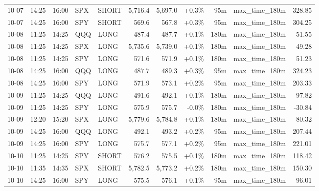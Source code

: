 \documentclass[11pt,a4paper,twoside]{article}
\begin{document}
\begin{center}
\begin{longtable}{>{\color{txtmain}}l l l l l r r r r >{\color{txtmain}}l r}
10-07 & 14:25 & 16:00 & SPX & SHORT & 5,716.4 & 5,697.0 & \textcolor{wingreen}{+0.3\%} & 95m & max\_time\_180m & \textcolor{wingreen}{328.85} \\
10-07 & 14:25 & 16:00 & SPY & SHORT & 569.6 & 567.8 & \textcolor{wingreen}{+0.3\%} & 95m & max\_time\_180m & \textcolor{wingreen}{304.25} \\
10-08 & 11:25 & 14:25 & QQQ & LONG & 487.4 & 487.7 & \textcolor{wingreen}{+0.1\%} & 180m & max\_time\_180m & \textcolor{wingreen}{51.55} \\
10-08 & 11:25 & 14:25 & SPX & LONG & 5,735.6 & 5,739.0 & \textcolor{wingreen}{+0.1\%} & 180m & max\_time\_180m & \textcolor{wingreen}{49.28} \\
10-08 & 11:25 & 14:25 & SPY & LONG & 571.6 & 571.9 & \textcolor{wingreen}{+0.1\%} & 180m & max\_time\_180m & \textcolor{wingreen}{51.23} \\
10-08 & 14:25 & 16:00 & QQQ & LONG & 487.7 & 489.3 & \textcolor{wingreen}{+0.3\%} & 95m & max\_time\_180m & \textcolor{wingreen}{324.23} \\
10-08 & 14:25 & 16:00 & SPY & LONG & 571.9 & 573.1 & \textcolor{wingreen}{+0.2\%} & 95m & max\_time\_180m & \textcolor{wingreen}{203.33} \\
10-09 & 11:25 & 14:25 & QQQ & LONG & 491.6 & 492.1 & \textcolor{wingreen}{+0.1\%} & 180m & max\_time\_180m & \textcolor{wingreen}{97.82} \\
10-09 & 11:25 & 14:25 & SPY & LONG & 575.9 & 575.7 & \textcolor{lossred}{-0.0\%} & 180m & max\_time\_180m & \textcolor{lossred}{-30.84} \\
10-09 & 12:20 & 15:20 & SPX & LONG & 5,779.6 & 5,784.8 & \textcolor{wingreen}{+0.1\%} & 180m & max\_time\_180m & \textcolor{wingreen}{80.32} \\
10-09 & 14:25 & 16:00 & QQQ & LONG & 492.1 & 493.2 & \textcolor{wingreen}{+0.2\%} & 95m & max\_time\_180m & \textcolor{wingreen}{207.44} \\
10-09 & 14:25 & 16:00 & SPY & LONG & 575.7 & 577.1 & \textcolor{wingreen}{+0.2\%} & 95m & max\_time\_180m & \textcolor{wingreen}{221.01} \\
10-10 & 11:25 & 14:25 & SPY & SHORT & 576.2 & 575.5 & \textcolor{wingreen}{+0.1\%} & 180m & max\_time\_180m & \textcolor{wingreen}{118.42} \\
10-10 & 11:35 & 14:35 & SPX & SHORT & 5,782.5 & 5,773.2 & \textcolor{wingreen}{+0.2\%} & 180m & max\_time\_180m & \textcolor{wingreen}{150.30} \\
10-10 & 14:25 & 16:00 & SPY & LONG & 575.5 & 576.1 & \textcolor{wingreen}{+0.1\%} & 95m & max\_time\_180m & \textcolor{wingreen}{96.01} \\

\end{longtable}
\end{center}
\end{document}
